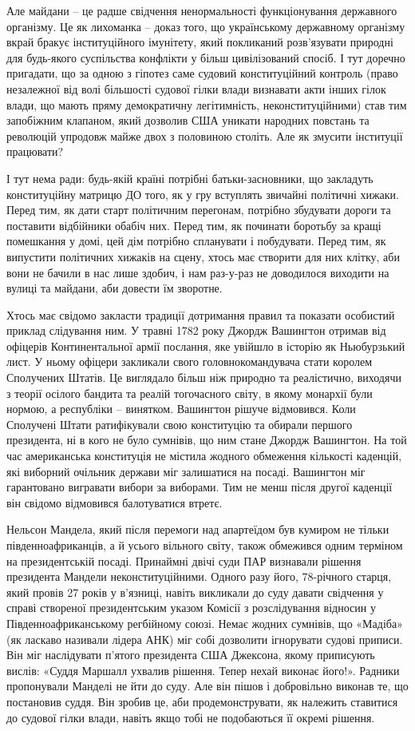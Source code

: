Але майдани – це радше свідчення ненормальності функціонування державного
організму. Це як лихоманка – доказ того, що українському державному організму
вкрай бракує інституційного імунітету, який покликаний розв’язувати природні
для будь-якого суспільства конфлікти у більш цивілізований спосіб. І тут
доречно пригадати, що за одною з гіпотез саме судовий конституційний контроль
(право незалежної від волі більшості судової гілки влади визнавати акти інших
гілок влади, що мають пряму демократичну легітимність, неконституційними) став
тим запобіжним клапаном, який дозволив США уникати народних повстань та
революцій упродовж майже двох з половиною століть. Але як змусити інституції
працювати?

І тут нема ради: будь-якій країні потрібні батьки-засновники, що закладуть
конституційну матрицю ДО того, як у гру вступлять звичайні політичні хижаки.
Перед тим, як дати старт політичним перегонам, потрібно збудувати дороги та
поставити відбійники обабіч них. Перед тим, як починати боротьбу за кращі
помешкання у домі, цей дім потрібно спланувати і побудувати. Перед тим, як
випустити політичних хижаків на сцену, хтось має створити для них клітку, аби
вони не бачили в нас лише здобич, і нам раз-у-раз не доводилося виходити на
вулиці та майдани, аби довести їм зворотне.

Хтось має свідомо закласти традиції дотримання правил та показати особистий
приклад слідування ним. У травні 1782 року Джордж Вашингтон отримав від
офіцерів Континентальної армії послання, яке увійшло в історію як Ньюбурзький
лист. У ньому офіцери закликали свого головнокомандувача стати королем
Сполучених Штатів. Це виглядало більш ніж природно та реалістично, виходячи з
теорії осілого бандита та реалій тогочасного світу, в якому монархії були
нормою, а республіки – винятком. Вашингтон рішуче відмовився. Коли Сполучені
Штати ратифікували свою конституцію та обирали першого президента, ні в кого не
було сумнівів, що ним стане Джордж Вашингтон. На той час американська
конституція не містила жодного обмеження кількості каденцій, які виборний
очільник держави міг залишатися на посаді. Вашингтон міг гарантовано вигравати
вибори за виборами. Тим не менш після другої каденції він свідомо відмовився
балотуватися втретє.

Нельсон Мандела, який після перемоги над апартеїдом був кумиром не тільки
південноафриканців, а й усього вільного світу, також обмежився одним терміном
на президентській посаді. Принаймні двічі суди ПАР визнавали рішення президента
Мандели неконституційними. Одного разу його, 78-річного старця, який провів 27
років у в’язниці, навіть викликали до суду давати свідчення у справі створеної
президентським указом Комісії з розслідування відносин у Південноафриканському
регбійному союзі. Немає жодних сумнівів, що «Мадіба» (як ласкаво називали
лідера АНК) міг собі дозволити ігнорувати судові приписи. Він міг наслідувати
п’ятого президента США Джексона, якому приписують вислів: «Суддя Маршалл
ухвалив рішення. Тепер нехай виконає його!». Радники пропонували Манделі не йти
до суду. Але він пішов і добровільно виконав те, що постановив суддя. Він
зробив це, аби продемонструвати, як належить ставитися до судової гілки влади,
навіть якщо тобі не подобаються її окремі рішення.

